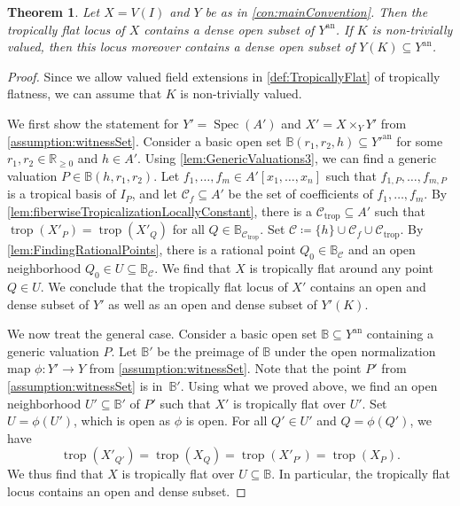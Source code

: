 \documentclass[12pt,reqno,a4paper]{amsart}
\theoremstyle{theoremstyle}
\newtheorem{theorem}{Theorem}[section]
\theoremstyle{examplestyle}
\theoremstyle{algorithmstyle}
\newcommand{\RR}{\mathbb{R}}
\newcommand{\an}{{\mathrm{an}}}
\DeclareMathOperator{\Spec}{Spec}
\DeclareMathOperator{\trop}{trop}
\begin{document}
\begin{theorem}\label{thm:TropicalGenericFlatness2}
  Let $X=V(I)$ and $Y$ be as in \cref{con:mainConvention}.
  Then the tropically flat locus of $X$ contains a dense open subset of $Y^{\mathrm{an}}$. If $K$ is non-trivially valued, then this locus moreover contains a dense open subset of $Y(K)\subseteq Y^\mathrm{an}$.
\end{theorem}
\begin{proof}
  Since we allow valued field extensions in \cref{def:TropicallyFlat} of tropically flatness, we can assume that $K$ is non-trivially valued.

  We first show the statement for $Y'=\Spec(A')$ and $X'=X\times_{Y} Y'$ from \cref{assumption:witnessSet}. Consider a basic open set $\mathbb{B}(r_{1},r_{2},h)\subseteq Y'^{\mathrm{an}}$ for some $r_1,r_2\in\RR_{\geq 0}$ and $h\in{A'}$.
  Using \cref{lem:GenericValuations3}, we can find a generic valuation $P\in \mathbb{B}(h,r_{1},r_{2})$.  Let $f_1,\dots,f_m\in A'[x_1,\dots,x_n]$ such that $f_{1,P},\dots,f_{m,P}$ is a tropical basis of $I_P$, and let $\mathcal C_f\subseteq A'$ be the set of coefficients of $f_1,\dots,f_m$.
  By \cref{lem:fiberwiseTropicalizationLocallyConstant}, there is a $\mathcal C_{\trop}\subseteq A'$ such that $\trop(X'_P)=\trop(X'_Q)$ for all $Q\in\mathbb{B}_{\mathcal{C}_{\trop}}$.
  Set $\mathcal C\coloneqq \{h\}\cup\mathcal C_f\cup\mathcal C_{\trop}$.
  By \cref{lem:FindingRationalPoints}, there is a rational point $Q_{0}\in \mathbb{B}_{\mathcal{C}}$ and an open neighborhood $Q_{0}\in U\subseteq \mathbb{B}_{\mathcal{C}}$.
  We find that $X$ is tropically flat around any point $Q\in{U}$. We conclude that the tropically flat locus of $X'$ contains an open and dense subset of $Y'$ as well as an open and dense subset of $Y'(K)$.

  We now treat the general case.  Consider a basic open set $\mathbb{B}\subseteq Y^\an$ containing a generic valuation $P$.  Let $\mathbb{B}'$ be the preimage of $\mathbb{B}$ under the open normalization map $\phi\colon Y'\to Y$ from \cref{assumption:witnessSet}.  Note that the point $P'$ from \cref{assumption:witnessSet} is in~$\mathbb{B}'$. Using what we proved above, we find an open neighborhood $U'\subseteq \mathbb{B}'$ of $P'$ such that $X'$ is tropically flat over $U'$.  Set $U=\phi(U')$, which is open as $\phi$ is open.  For all $Q'\in U'$ and $Q=\phi(Q')$, we have
  \begin{equation*}
\trop(X'_{Q'})=\trop(X_{Q})=\trop(X'_{P'})=\trop(X_{P}).
  \end{equation*}
  We thus find that $X$ is tropically flat over $U\subseteq \mathbb{B}$. In particular, the tropically flat locus contains an open and dense subset.
\end{proof}
\end{document}
